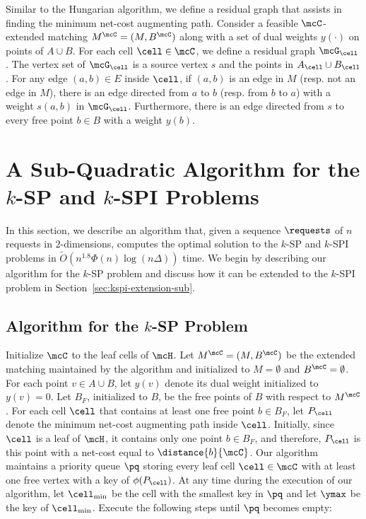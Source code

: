 Similar to the Hungarian algorithm, we define a residual graph that assists in finding the minimum net-cost augmenting path. Consider a feasible $\mcC$-extended matching $M^{\mcC}=(M,B^{\mcC})$ along with a set of dual weights $y(\cdot)$ on points of $A\cup B$. For each cell $\cell \in \mcC$, we define a residual graph $\mcG_{\cell}$. The vertex set of $\mcG_{\cell}$ is a source vertex $s$ and the points in $A_{\cell}\cup B_{\cell}$. For any edge $(a,b)\in E$ inside $\cell$, if $(a,b)$ is an edge in $M$ (resp. not an edge in $M$), there is an edge directed from $a$ to $b$ (resp. from $b$ to $a$) with a weight $s(a,b)$ in $\mcG_\cell$. Furthermore, there is an edge directed from $s$ to every free point $b\in B$ with a weight $y(b)$.

\section{A Sub-Quadratic Algorithm for the \texorpdfstring{$k$}{}-SP and \texorpdfstring{$k$}{}-SPI Problems}\label{sec:k-seq}
In this section, we describe an algorithm that, given a sequence $\requests$ of $n$ requests in $2$-dimensions, computes the optimal solution to the $k$-SP and $k$-SPI problems in $\tilde{O}(n^{1.8}\Phi(n)\log(n\Delta))$ time. We begin by describing our algorithm for the $k$-SP problem and discuss how it can be extended to the $k$-SPI problem in Section~\ref{sec:kspi-extension-sub}.


\subsection{Algorithm for the \texorpdfstring{$k$}{}-SP Problem}
Initialize $\mcC$ to the leaf cells of $\mcH$. Let $M^{\mcC}=(M, B^{\mcC})$ be the extended matching maintained by the algorithm and initialized to $M=\emptyset$ and $B^{\mcC}=\emptyset$. For each point $v \in A\cup B$, let $y(v)$ denote its dual weight initialized to $y(v)=0$. Let $B_F$, initialized to $B$, be the free points of $B$ with respect to $M^{\mcC}$. For each cell $\cell$ that contains at least one free point $b \in B_F$, let $P_\cell$ denote the minimum net-cost augmenting path inside $\cell$. Initially, since $\cell$ is a leaf of $\mcH$, it contains only one point $b \in B_F$, and therefore, $P_{\cell}$ is this point with a net-cost equal to $\distance{b}{\mcC}$. Our algorithm maintains a priority queue $\pq$ storing every leaf cell $\cell\in\mcC$ with at least one free vertex with a key of $\phi(P_\cell)$. 
At any time during the execution of our algorithm, let $\cell_{\min}$ be the cell with the smallest key in $\pq$ and let $\ymax$ be the key of $\cell_{\min}$.
Execute the following steps until $\pq$ becomes empty:

